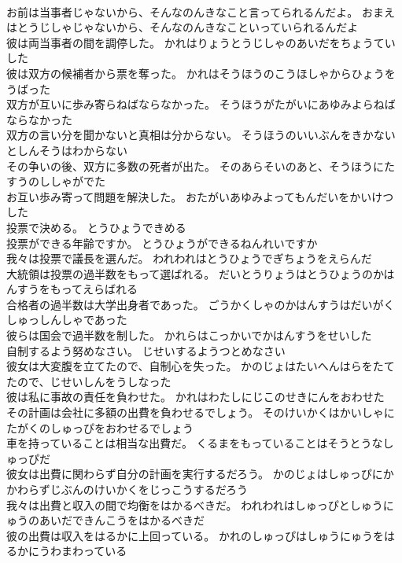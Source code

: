 \documentclass[8pt]{extreport}
\begin{document}
\begin{CJK}{UTF8}{min}
\\	お前は当事者じゃないから、そんなのんきなこと言ってられるんだよ。	おまえはとうじしゃじゃないから、そんなのんきなこといっていられるんだよ 
\\	彼は両当事者の間を調停した。	かれはりょうとうじしゃのあいだをちょうていした 
\\	彼は双方の候補者から票を奪った。	かれはそうほうのこうほしゃからひょうをうばった 
\\	双方が互いに歩み寄らねばならなかった。	そうほうがたがいにあゆみよらねばならなかった 
\\	双方の言い分を聞かないと真相は分からない。	そうほうのいいぶんをきかないとしんそうはわからない 
\\	その争いの後、双方に多数の死者が出た。	そのあらそいのあと、そうほうにたすうのししゃがでた 
\\	お互い歩み寄って問題を解決した。	おたがいあゆみよってもんだいをかいけつした 
\\	投票で決める。	とうひょうできめる 
\\	投票ができる年齢ですか。	とうひょうができるねんれいですか 
\\	我々は投票で議長を選んだ。	われわれはとうひょうでぎちょうをえらんだ 
\\	大統領は投票の過半数をもって選ばれる。	だいとうりょうはとうひょうのかはんすうをもってえらばれる 
\\	合格者の過半数は大学出身者であった。	ごうかくしゃのかはんすうはだいがくしゅっしんしゃであった 
\\	彼らは国会で過半数を制した。	かれらはこっかいでかはんすうをせいした 
\\	自制するよう努めなさい。	じせいするようつとめなさい 
\\	彼女は大変腹を立てたので、自制心を失った。	かのじょはたいへんはらをたてたので、じせいしんをうしなった 
\\	彼は私に事故の責任を負わせた。	かれはわたしにじこのせきにんをおわせた 
\\	その計画は会社に多額の出費を負わせるでしょう。	そのけいかくはかいしゃにたがくのしゅっぴをおわせるでしょう 
\\	車を持っていることは相当な出費だ。	くるまをもっていることはそうとうなしゅっぴだ 
\\	彼女は出費に関わらず自分の計画を実行するだろう。	かのじょはしゅっぴにかかわらずじぶんのけいかくをじっこうするだろう 
\\	我々は出費と収入の間で均衡をはかるべきだ。	われわれはしゅっぴとしゅうにゅうのあいだできんこうをはかるべきだ 
\\	彼の出費は収入をはるかに上回っている。	かれのしゅっぴはしゅうにゅうをはるかにうわまわっている 

\end{CJK}
\end{document}
